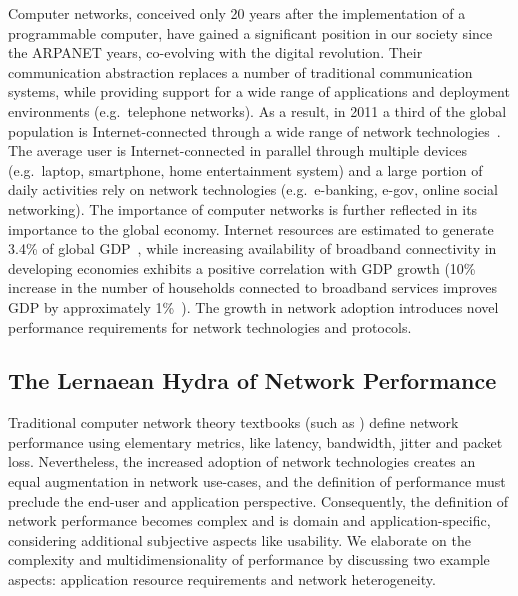 Computer networks, conceived only 20 years after the implementation of a
programmable computer, have gained a significant position in our society since
the ARPANET years, co-evolving with the digital revolution.  Their
communication abstraction replaces a number of traditional communication
systems, while providing support for a wide range of applications and
deployment environments (e.g.~telephone networks).  As a result, in 2011 a
third of the global population is Internet-connected through a wide range of
network technologies~.  The average user is
Internet-connected in parallel through multiple devices (e.g.~laptop,
smartphone, home entertainment system) and a large portion of daily activities
rely on network technologies (e.g.~e-banking, e-gov, online social networking).
The importance of computer networks is further reflected in its importance to
the global economy. Internet resources are estimated to generate 3.4\% of
global GDP~, while increasing availability of broadband
connectivity in developing economies exhibits a positive correlation with GDP
growth (10\% increase in the number of households connected to broadband
services improves GDP by approximately 1\%~).  The growth in
network adoption introduces novel performance requirements for network
technologies and protocols.  

\subsection{The Lernaean Hydra of Network Performance} \label{sec:intro:perf_complexity}

Traditional computer network theory textbooks (such as )
define network performance using elementary metrics, like latency, bandwidth,
jitter and packet loss. Nevertheless, the increased adoption of network
technologies creates an equal augmentation in network use-cases, and the
definition of performance must preclude the end-user and application
perspective.  Consequently, the definition of network performance becomes
complex and is domain and application-specific, considering additional
subjective aspects like usability.  We elaborate on the complexity and
multidimensionality of performance by discussing two example aspects:
application resource requirements and network heterogeneity. 

